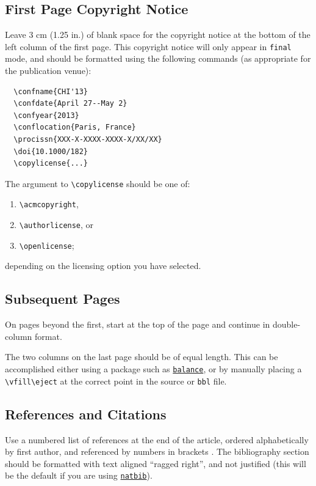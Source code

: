 \documentclass[preprint]{../latex/sigchi-modern}
\begin{document}
\subsection{First Page Copyright Notice}
Leave 3 cm (1.25 in.) of blank space for the copyright notice at the bottom of
the left column of the first page. This copyright notice will only appear in
\texttt{final} mode, and should be formatted using the following commands (as
appropriate for the publication venue):
\begin{verbatim}
  \confname{CHI'13}
  \confdate{April 27--May 2}
  \confyear{2013}
  \conflocation{Paris, France}
  \procissn{XXX-X-XXXX-XXXX-X/XX/XX}
  \doi{10.1000/182}
  \copylicense{...}
\end{verbatim}

The argument to \texttt{\textbackslash copylicense} should be one of:
\begin{enumerate}
  \item\texttt{\textbackslash acmcopyright}, 
  \item\texttt{\textbackslash authorlicense}, or 
  \item\texttt{\textbackslash openlicense}; 
\end{enumerate}
depending on the licensing option you have selected.

\subsection{Subsequent Pages}
On pages beyond the first, start at the top of the page and continue in
double-column format.

The two columns on the last page should be of equal length. This can be 
accomplished either using a package such as 
\texttt{\href{http://ctan.org/pkg/balance}{balance}}, or by manually placing
a \texttt{\textbackslash vfill\textbackslash eject} at the correct point in
the source or \texttt{bbl} file.

\subsection{References and Citations}
Use a numbered list of references at the end of the article, ordered
alphabetically by first author, and referenced by numbers in brackets
\cite{Card1983,Card1990,Card1991,Gillick1996}.
The bibliography section should be formatted with text aligned ``ragged right'',
and not justified (this will be the default if you are using
\texttt{\href{http://ctan.org/pkg/natbib}{natbib}}).
\end{document}

